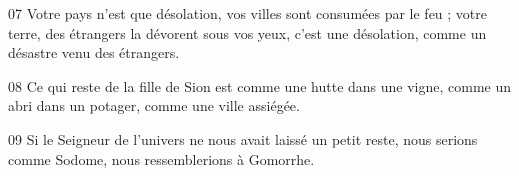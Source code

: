 
07 Votre pays n’est que désolation, vos villes sont consumées par le feu ; votre terre, des étrangers la dévorent sous vos yeux, c’est une désolation, comme un désastre venu des étrangers.

08 Ce qui reste de la fille de Sion est comme une hutte dans une vigne, comme un abri dans un potager, comme une ville assiégée.

09 Si le Seigneur de l’univers ne nous avait laissé un petit reste, nous serions comme Sodome, nous ressemblerions à Gomorrhe.